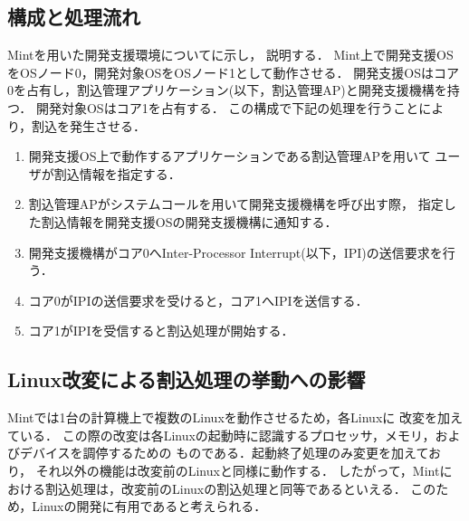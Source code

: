 \documentclass[submit,techreq,noauthor,dvipdfmx]{ipsj}
\begin{document}
\subsection{構成と処理流れ}\label{sec:structure_and_processing_flow}


Mintを用いた開発支援環境についてに示し，
説明する．
Mint上で開発支援OSをOSノード0，開発対象OSをOSノード1として動作させる．
開発支援OSはコア0を占有し，割込管理アプリケーション(以下，割込管理AP)と開発支援機構を持つ．
開発対象OSはコア1を占有する．
この構成で下記の処理を行うことにより，割込を発生させる．

\begin{enumerate}
    \item 
        開発支援OS上で動作するアプリケーションである割込管理APを用いて
        ユーザが割込情報を指定する．
    \item 
        割込管理APがシステムコールを用いて開発支援機構を呼び出す際，
        指定した割込情報を開発支援OSの開発支援機構に通知する．   
    \item 
        開発支援機構がコア0へInter-Processor Interrupt(以下，IPI)の送信要求を行う．
    \item 
        コア0がIPIの送信要求を受けると，コア1へIPIを送信する．
    \item 
        コア1がIPIを受信すると割込処理が開始する．
\end{enumerate}

\subsection{Linux改変による割込処理の挙動への影響}\label{sec:impact_to_linux}

Mintでは1台の計算機上で複数のLinuxを動作させるため，各Linuxに
改変を加えている\cite{kitagawa}．
この際の改変は各Linuxの起動時に認識するプロセッサ，メモリ，およびデバイスを調停するための
ものである．起動終了処理のみ変更を加えており，
それ以外の機能は改変前のLinuxと同様に動作する．
したがって，Mintにおける割込処理は，改変前のLinuxの割込処理と同等であるといえる．
このため，Linuxの開発に有用であると考えられる．

\end{document}
